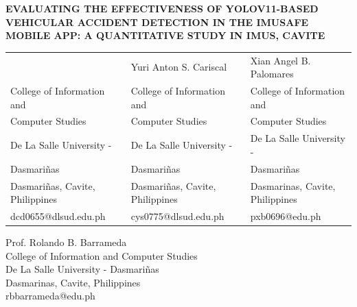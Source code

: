 \documentclass[12pt,a4paper]{article}
\begin{document}
\begin{center}
{\fontsize{16}{20}\bfseries
EVALUATING THE EFFECTIVENESS OF YOLOV11-BASED\\
VEHICULAR ACCIDENT DETECTION IN THE IMUSAFE\\
MOBILE APP: A QUANTITATIVE STUDY IN IMUS, CAVITE\par
}
\end{center}

\vspace{-1.5em} 

\begin{center}
{\fontsize{10.5}{12}\selectfont 
\begin{tabular}{>{\centering\arraybackslash}p{}
                >{\centering\arraybackslash}p{}
                >{\centering\arraybackslash}p{}}

{\normalsize Christian Elijah DC. Darvin} & {\normalsize Yuri Anton S. Cariscal} & {\normalsize Xian Angel B. Palomares} \\
College of Information and & College of Information and & College of Information and \\
Computer Studies & Computer Studies & Computer Studies \\
De La Salle University - & De La Salle University - & De La Salle University - \\
Dasmariñas & Dasmariñas & Dasmariñas \\
Dasmariñas, Cavite, Philippines & Dasmariñas, Cavite, Philippines & Dasmarinas, Cavite, Philippines \\
dcd0655@dlsud.edu.ph & cys0775@dlsud.edu.ph & pxb0696@edu.ph \\

\end{tabular}

\vspace{1.5em}

{\normalsize Prof. Rolando B. Barrameda}\\
College of Information and Computer Studies\\
De La Salle University - Dasmariñas\\
Dasmarinas, Cavite, Philippines\\
rbbarrameda@edu.ph
\par}
\end{center}
\end{document}
